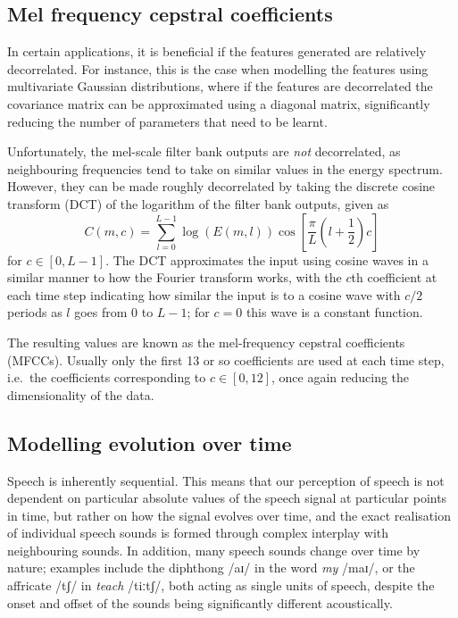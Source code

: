 \subsection{Mel frequency cepstral coefficients}

In certain applications, it is beneficial if the features generated are relatively decorrelated.
For instance, this is the case when modelling the features using multivariate Gaussian distributions, where if the features are decorrelated the covariance matrix can be approximated using a diagonal matrix, significantly reducing the number of parameters that need to be learnt.

Unfortunately, the mel-scale filter bank outputs are \emph{not} decorrelated, as neighbouring frequencies tend to take on similar values in the energy spectrum.
However, they can be made roughly decorrelated by taking the discrete cosine transform (DCT) of the logarithm of the filter bank outputs, given as
\begin{equation}
C(m,c) = \sum_{l=0}^{L-1} \log(E(m,l)) \cos\left[\frac{\pi}{L}\left(l+\frac{1}{2}\right)c\right]
\end{equation}
for $c \in [0, L - 1]$.
The DCT approximates the input using cosine waves in a similar manner to how the Fourier transform works, with the $c$th coefficient at each time step indicating how similar the input is to a cosine wave with $c/2$ periods as $l$ goes from $0$ to $L-1$; for $c=0$ this wave is a constant function.

The resulting values are known as the mel-frequency cepstral coefficients (MFCCs).
Usually only the first 13 or so coefficients are used at each time step, i.e.\ the coefficients corresponding to $c \in [0, 12]$, once again reducing the dimensionality of the data.

\subsection{Modelling evolution over time}

Speech is inherently sequential.
This means that our perception of speech is not dependent on particular absolute values of the speech signal at particular points in time, but rather on how the signal evolves over time, and the exact realisation of individual speech sounds is formed through complex interplay with neighbouring sounds.
In addition, many speech sounds change over time by nature; examples include the diphthong /aɪ/ in the word \emph{my} /maɪ/, or the affricate /tʃ/ in \emph{teach} /tiːtʃ/, both acting as single units of speech, despite the onset and offset of the sounds being significantly different acoustically.

